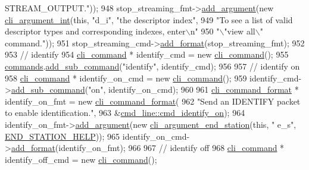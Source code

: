 \begin{DoxyCode}
{       STREAM\_OUTPUT."}));
948     stop\_streaming\_fmt->\hyperlink{classcli__command__format_ac3fc6d13a227c195d5ee6f7b78eba9cd}{add\_argument}(\textcolor{keyword}{new} \hyperlink{classcli__argument__int}{cli\_argument\_int}(\textcolor{keyword}{this}, \textcolor{stringliteral}{"d\_i"}, \textcolor{stringliteral}{"the
       descriptor index"},
949                                                           \textcolor{stringliteral}{"To see a list of valid descriptor types and
       corresponding indexes, enter\(\backslash\)n"}
950                                                           \textcolor{stringliteral}{"\(\backslash\)"view all\(\backslash\)" command."}));
951     stop\_streaming\_cmd->\hyperlink{classcli__command_aa9ec38e761644d946f8db2b920e39921}{add\_format}(stop\_streaming\_fmt);
952 
953     \textcolor{comment}{// identify}
954     \hyperlink{classcli__command}{cli\_command} * identify\_cmd = \textcolor{keyword}{new} \hyperlink{classcli__command}{cli\_command}();
955     \hyperlink{classcmd__line_ae4fea670c2fdd2b60f7b5b6ad6fbaf1e}{commands}.\hyperlink{classcli__command_aa73a67e8ebb6facd4b40ced66279b226}{add\_sub\_command}(\textcolor{stringliteral}{"identify"}, identify\_cmd);
956 
957     \textcolor{comment}{// identify on}
958     \hyperlink{classcli__command}{cli\_command} * identify\_on\_cmd = \textcolor{keyword}{new} \hyperlink{classcli__command}{cli\_command}();
959     identify\_cmd->\hyperlink{classcli__command_aa73a67e8ebb6facd4b40ced66279b226}{add\_sub\_command}(\textcolor{stringliteral}{"on"}, identify\_on\_cmd);
960 
961     \hyperlink{classcli__command__format}{cli\_command\_format} * identify\_on\_fmt = \textcolor{keyword}{new} 
      \hyperlink{classcli__command__format}{cli\_command\_format}(
962         \textcolor{stringliteral}{"Send an IDENTIFY packet to enable identification."},
963         &\hyperlink{classcmd__line_af79a63276ca3c978a748f9491cf006c7}{cmd\_line::cmd\_identify\_on});
964     identify\_on\_fmt->\hyperlink{classcli__command__format_ac3fc6d13a227c195d5ee6f7b78eba9cd}{add\_argument}(\textcolor{keyword}{new} \hyperlink{classcli__argument__end__station}{cli\_argument\_end\_station}(\textcolor{keyword}{this}, \textcolor{stringliteral}{"
      e\_s"}, \hyperlink{cmd__line_8cpp_a5ca225cf97165ab1d1472609c4e765f6}{END\_STATION\_HELP}));
965     identify\_on\_cmd->\hyperlink{classcli__command_aa9ec38e761644d946f8db2b920e39921}{add\_format}(identify\_on\_fmt);
966 
967     \textcolor{comment}{// identify off}
968     \hyperlink{classcli__command}{cli\_command} * identify\_off\_cmd = \textcolor{keyword}{new} \hyperlink{classcli__command}{cli\_command}();

\end{DoxyCode}

